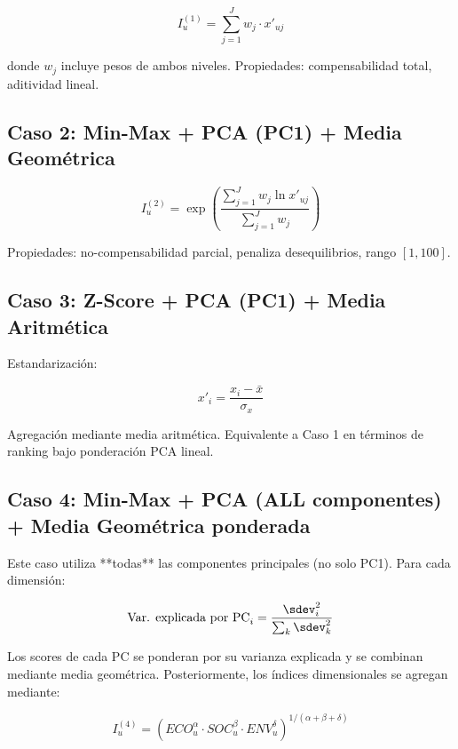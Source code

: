 \begin{equation}
    I_u^{(1)} = \sum_{j=1}^{J} w_j \cdot x'_{uj}
\end{equation}

donde $w_j$ incluye pesos de ambos niveles. Propiedades: compensabilidad total, aditividad lineal.

\subsection{Caso 2: Min-Max + PCA (PC1) + Media Geométrica}

\begin{equation}
    I_u^{(2)} = \exp\left(\frac{\sum_{j=1}^{J} w_j \ln x'_{uj}}{\sum_{j=1}^{J} w_j}\right)
\end{equation}

Propiedades: no-compensabilidad parcial, penaliza desequilibrios, rango $[1, 100]$.

\subsection{Caso 3: Z-Score + PCA (PC1) + Media Aritmética}

Estandarización:

\begin{equation}
    x'_i = \frac{x_i - \bar{x}}{\sigma_x}
\end{equation}

Agregación mediante media aritmética. Equivalente a Caso 1 en términos de ranking bajo ponderación PCA lineal.

\subsection{Caso 4: Min-Max + PCA (ALL componentes) + Media Geométrica ponderada}

Este caso utiliza **todas** las componentes principales (no solo PC1). Para cada dimensión:

\begin{equation}
    \text{Var. explicada por PC}_i = \frac{\sdev_i^2}{\sum_k \sdev_k^2}
\end{equation}

Los scores de cada PC se ponderan por su varianza explicada y se combinan mediante media geométrica. Posteriormente, los índices dimensionales se agregan mediante:

\begin{equation}
    I_u^{(4)} = (ECO_u^{\alpha} \cdot SOC_u^{\beta} \cdot ENV_u^{\delta})^{1/(\alpha+\beta+\delta)}
\end{equation}

